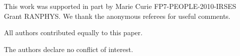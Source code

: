 \documentclass[information,article,submit,moreauthors,pdftex,12pt,a4paper]{mdpi}
\theoremstyle{mdpi}
\newcounter{re}
\theoremstyle{mdpidefinition}
\begin{document}

This work was supported in part by Marie Curie FP7-PEOPLE-2010-IRSES Grant RANPHYS.
We thank the anonymous referees for useful comments.


All authors  contributed equally to this paper.



The authors declare no conflict of interest.


%
%
\end{document}
